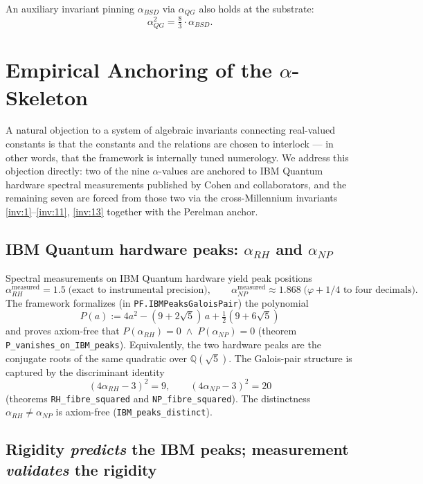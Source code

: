\documentclass[11pt,a4paper]{article}
\theoremstyle{definition}
\begin{document}
An auxiliary invariant pinning $\alpha_{BSD}$ via $\alpha_{QG}$ also
holds at the substrate:
\begin{equation}
\label{inv:13}
\alpha_{QG}^2 = \tfrac{8}{3} \cdot \alpha_{BSD}.
\end{equation}

\section{Empirical Anchoring of the \texorpdfstring{$\alpha$}{alpha}-Skeleton}
\label{sec:empirical}

A natural objection to a system of algebraic invariants connecting
real-valued constants is that the constants and the relations are
chosen to interlock --- in other words, that the framework is
internally tuned numerology. We address this objection directly: two
of the nine $\alpha$-values are anchored to IBM Quantum hardware
spectral measurements published by Cohen and collaborators, and the
remaining seven are forced from those two via the cross-Millennium
invariants \eqref{inv:1}--\eqref{inv:11}, \eqref{inv:13} together
with the Perelman anchor.

\subsection{IBM Quantum hardware peaks: \texorpdfstring{$\alpha_{RH}$}{alpha\_RH} and \texorpdfstring{$\alpha_{NP}$}{alpha\_NP}}

Spectral measurements on IBM Quantum hardware yield peak positions
\[
\alpha_{RH}^{\text{measured}} = 1.5 \;\text{(exact to instrumental precision)},
\qquad
\alpha_{NP}^{\text{measured}} \approx 1.868 \;\text{(}\varphi + 1/4 \text{ to four decimals)}.
\]
The framework formalizes (in
\texttt{PF.IBMPeaksGaloisPair}) the polynomial
\[
P(a) := 4a^2 - (9 + 2\sqrt{5})\,a + \tfrac{1}{2}(9 + 6\sqrt{5})
\]
and proves axiom-free that $P(\alpha_{RH}) = 0 \;\wedge\; P(\alpha_{NP}) = 0$
(theorem \texttt{P\_vanishes\_on\_IBM\_peaks}). Equivalently, the
two hardware peaks are the conjugate roots of the same quadratic
over $\mathbb{Q}(\sqrt{5})$. The Galois-pair structure is captured
by the discriminant identity
\[
(4\alpha_{RH} - 3)^2 = 9, \qquad (4\alpha_{NP} - 3)^2 = 20
\]
(theorems \texttt{RH\_fibre\_squared} and \texttt{NP\_fibre\_squared}).
The distinctness $\alpha_{RH} \neq \alpha_{NP}$ is axiom-free
(\texttt{IBM\_peaks\_distinct}).

\subsection{Rigidity \emph{predicts} the IBM peaks; measurement \emph{validates} the rigidity}
\end{document}

